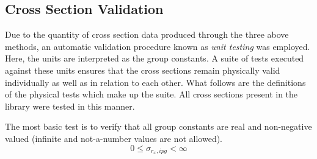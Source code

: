 \subsection{Cross Section Validation}
\label{mg:xs_validation}
Due to the quantity of cross section data produced through the three above methods, 
an automatic validation procedure known as \emph{unit testing}
was employed.  Here, the units are interpreted as the group constants.   A suite of tests 
executed against these units ensures that the cross sections remain physically valid 
individually as well as in relation to each other. What follows are the definitions of the 
physical tests which make up the suite.  All cross sections present in the library were tested 
in this manner.

The most basic test is to verify that all group constants are real and non-negative valued 
(infinite and not-a-number values are not allowed).  
\begin{equation}
\label{nn_ut}
0 \le \sigma_{r_x,ipg} < \infty
\end{equation}

